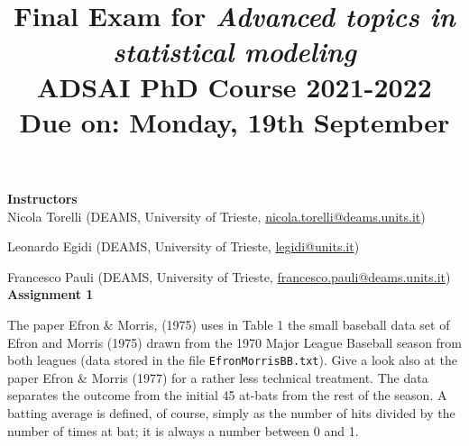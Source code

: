 \title{\large{
\textbf{Final Exam for \emph{Advanced topics in statistical modeling}}\\
ADSAI PhD Course 2021-2022 }\\
Due on: Monday, 19th September}
%
%
\date{}
\maketitle
%
\hspace{-0.8cm}
\textbf{Instructors} \\

Nicola Torelli (DEAMS, University of Trieste, \url{nicola.torelli@deams.units.it})

Leonardo Egidi (DEAMS, University of Trieste, \url{legidi@units.it})

Francesco Pauli (DEAMS, University of Trieste, \url{francesco.pauli@deams.units.it})\\

\hspace{-0.8cm}
\textbf{Assignment 1}
\vspace{0.5cm}

The paper Efron \& Morris, (1975) uses in Table 1 the small baseball data set of Efron and Morris (1975) drawn from the 1970 Major League Baseball season from both leagues (data stored in the file \texttt{EfronMorrisBB.txt}). Give a look also at the paper Efron \& Morris (1977) for a rather less technical treatment.  The data separates the outcome from the initial 45 at-bats from the rest of the season. A
batting average is defined, of course, simply as the number of hits divided by
the number of times at bat; it is always a number between 0 and 1.

